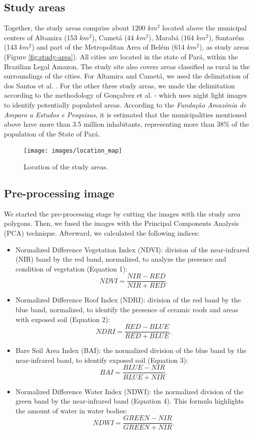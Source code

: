 \documentclass[preprint, 3p,
authoryear]{elsarticle} %
\providecommand{\tightlist}{%
  \setlength{\itemsep}{0pt}\setlength{\parskip}{0pt}}
\begin{document}
\hypertarget{study-areas}{%
\subsection{Study areas}\label{study-areas}}

Together, the study areas comprise about 1200 \(km^2\) located above the
municipal centers of Altamira (153 \(km^2\)), Cametá (44 \(km^2\)),
Marabá (164 \(km^2\)), Santarém (143 \(km^2\)) and part of the
Metropolitan Area of Belém (614 \(km^2\)), as study areas (Figure
\ref{fig:study-area}). All cities are located in the state of Pará,
within the Brazilian Legal Amazon. The study site also covers areas
classified as rural in the surroundings of the cities. For Altamira and
Cametá, we used the delimitation of dos Santos et al.
\citeyearpar{Santos2022}. For the other three study areas, we made the
delimitation according to the methodology of Gonçalvez et al.
\citeyearpar{Goncalves2021} - which uses night light images to identify
potentially populated areas. According to the \emph{Fundação Amazônia de
Amparo a Estudos e Pesquisas}, it is estimated that the municipalities
mentioned above have more than 3.5 million inhabitants, representing
more than 38\% of the population of the State of Pará.

\begin{figure}
\texttt{[image: images/location\_map]} \caption{\label{fig:study-area}Location of the study areas.}\label{fig:fig-1}
\end{figure}

\hypertarget{pre-processing-image}{%
\subsection{Pre-processing image}\label{pre-processing-image}}

We started the pre-processing stage by cutting the images with the study
area polygons. Then, we fused the images with the Principal Components
Analysis (PCA) technique. Afterward, we calculated the following
indices:

\begin{itemize}
\tightlist
\item
  Normalized Difference Vegetation Index (NDVI): division of the
  near-infrared (NIR) band by the red band, normalized, to analyze the
  presence and condition of vegetation (Equation 1): \[ 
  NDVI = \frac{NIR - RED}{NIR + RED}.
  \]
\item
  Normalized Difference Roof Index (NDRI): division of the red band by
  the blue band, normalized, to identify the presence of ceramic roofs
  and areas with exposed soil (Equation 2): \[ 
  NDRI = \frac{RED - BLUE}{RED + BLUE}.
  \]
\item
  Bare Soil Area Index (BAI): the normalized division of the blue band
  by the near-infrared band, to identify exposed soil (Equation 3): \[ 
  BAI = \frac{BLUE - NIR}{BLUE + NIR}.
  \]
\item
  Normalized Difference Water Index (NDWI): the normalized division of
  the green band by the near-infrared band (Equation 4). This formula
  highlights the amount of water in water bodies: \[ 
  NDWI = \frac{GREEN - NIR}{GREEN + NIR}.
  \]
\end{itemize}
\end{document}
